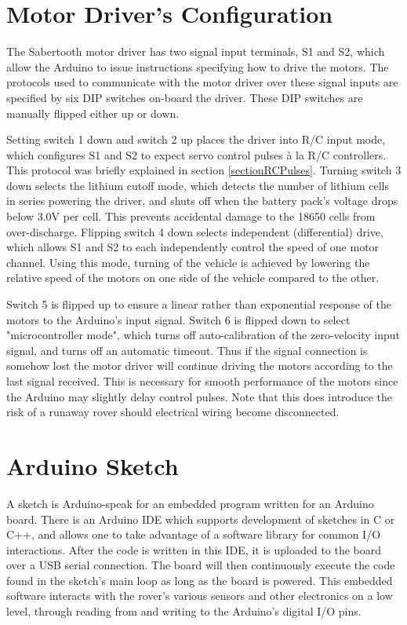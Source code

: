 \section{Motor Driver's Configuration}
The Sabertooth motor driver has two signal input terminals, S1 and S2, which allow the Arduino to issue instructions specifying how to drive the motors. The protocols used to communicate with the motor driver over these signal inputs are specified by six DIP switches on-board the driver. These DIP switches are manually flipped either up or down.


Setting switch 1 down and switch 2 up places the driver into R/C input mode, which configures S1 and S2 to expect servo control pulses \`a la R/C controllers. This protocol was briefly explained in section \ref{sectionRCPulses}. Turning switch 3 down selects the lithium cutoff mode, which detects the number of lithium cells in series powering the driver, and shuts off when the battery pack's voltage drops below 3.0V per cell. This prevents accidental damage to the 18650 cells from over-discharge. Flipping switch 4 down selects independent (differential) drive, which allows S1 and S2 to each independently control the speed of one motor channel. Using this mode, turning of the vehicle is achieved by lowering the relative speed of the motors on one side of the vehicle compared to the other.

Switch 5 is flipped up to ensure a linear rather than exponential response of the motors to the Arduino's input signal. Switch 6 is flipped down to select "microcontroller mode", which turns off auto-calibration of the zero-velocity input signal, and turns off an automatic timeout. Thus if the signal connection is somehow lost the motor driver will continue driving the motors according to the last signal received. This is necessary for smooth performance of the motors since the Arduino may slightly delay control pulses. Note that this does introduce the risk of a runaway rover should electrical wiring become disconnected.

\section{Arduino Sketch}
A sketch is Arduino-speak for an embedded program written for an Arduino board. There is an Arduino IDE which supports development of sketches in C or C++, and allows one to take advantage of a software library for common I/O interactions. After the code is written in this IDE, it is uploaded to the board over a USB serial connection. The board will then continuously execute the code found in the sketch's main loop as long as the board is powered. This embedded software interacts with the rover's various sensors and other electronics on a low level, through reading from and writing to the Arduino's digital I/O pins.

